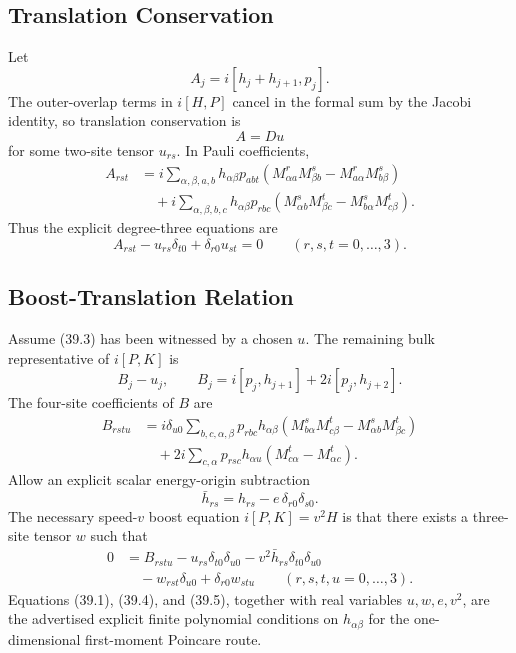 \subsection{Translation Conservation}

Let
\[
  A_j=i[h_j+h_{j+1},p_j].
\]
The outer-overlap terms in \(i[H,P]\) cancel in the formal sum by the Jacobi
identity, so translation conservation is
\[
  A=D u
  \tag{39.3}
\]
for some two-site tensor \(u_{rs}\).  In Pauli coefficients,
\[
\begin{aligned}
  A_{rst}
  &=
  i\sum_{\alpha,\beta,a,b}
  h_{\alpha\beta}p_{abt}
  \left(M_{\alpha a}^{r}M_{\beta b}^{s}
       -M_{a\alpha}^{r}M_{b\beta}^{s}\right)\\
  &\quad+
  i\sum_{\alpha,\beta,b,c}
  h_{\alpha\beta}p_{rbc}
  \left(M_{\alpha b}^{s}M_{\beta c}^{t}
       -M_{b\alpha}^{s}M_{c\beta}^{t}\right).
\end{aligned}
\]
Thus the explicit degree-three equations are
\[
  A_{rst}-u_{rs}\delta_{t0}+\delta_{r0}u_{st}=0
  \qquad(r,s,t=0,\ldots,3).
  \tag{39.4}
\]

\subsection{Boost-Translation Relation}

Assume (39.3) has been witnessed by a chosen \(u\).  The remaining bulk
representative of \(i[P,K]\) is
\[
  B_j-u_j,\qquad
  B_j=i[p_j,h_{j+1}]+2i[p_j,h_{j+2}].
\]
The four-site coefficients of \(B\) are
\[
\begin{aligned}
  B_{rstu}
  &=
  i\delta_{u0}\sum_{b,c,\alpha,\beta}
  p_{rbc}h_{\alpha\beta}
  \left(M_{b\alpha}^{s}M_{c\beta}^{t}
       -M_{\alpha b}^{s}M_{\beta c}^{t}\right)\\
  &\quad+
  2i\sum_{c,\alpha}
  p_{rsc}h_{\alpha u}
  \left(M_{c\alpha}^{t}-M_{\alpha c}^{t}\right).
\end{aligned}
\]
Allow an explicit scalar energy-origin subtraction
\[
  \bar h_{rs}=h_{rs}-e\,\delta_{r0}\delta_{s0}.
\]
The necessary speed-\(v\) boost equation \(i[P,K]=v^2H\) is that there exists a
three-site tensor \(w\) such that
\[
\begin{aligned}
  0
  &=
  B_{rstu}
  -u_{rs}\delta_{t0}\delta_{u0}
  -v^2\bar h_{rs}\delta_{t0}\delta_{u0}\\
  &\quad
  -w_{rst}\delta_{u0}
  +\delta_{r0}w_{stu}
  \qquad(r,s,t,u=0,\ldots,3).
\end{aligned}
  \tag{39.5}
\]
Equations (39.1), (39.4), and (39.5), together with real variables
\(u,w,e,v^2\), are the advertised explicit finite polynomial conditions on
\(h_{\alpha\beta}\) for the one-dimensional first-moment Poincare route.

